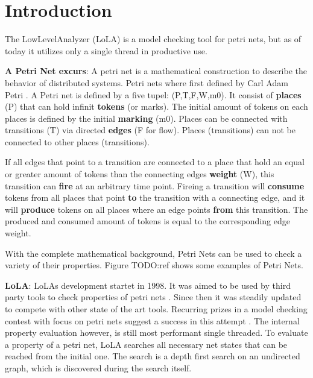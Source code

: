 \chapter{Introduction}

The LowLevelAnalyzer (LoLA) is a model checking tool for petri nets, but as of today it utilizes only a single thread in productive use.

\textbf{A Petri Net excurs}:
A petri net is a mathematical construction to describe the behavior of distributed systems. Petri nets where first defined by Carl Adam Petri \cite{petri1962kommunikation}. A Petri net is defined by a five tupel: (P,T,F,W,m0). It consist of \textbf{places} (P) that can hold infinit \textbf{tokens} (or marks). The initial amount of tokens on each places is defined by the initial \textbf{marking} (m0). Places can be connected with transitions (T) via directed \textbf{edges} (F for flow). Places (transitions) can not be connected to other places (transitions). 

If all edges that point to a transition are connected to a place that hold an equal or greater amount of tokens than the connecting edges \textbf{weight} (W), this transition can \textbf{fire} at an arbitrary time point. Fireing a transition will \textbf{consume} tokens from all places that point \textbf{to} the transition with a connecting edge, and it will \textbf{produce} tokens on all places where an edge points \textbf{from} this transition. The produced and consumed amount of tokens is equal to the corresponding edge weight.

With the complete mathematical background, Petri Nets can be used to check a variety of their properties. Figure TODO:ref shows some examples of Petri Nets.



\textbf{LoLA}:
LoLAs development startet in 1998. It was aimed to be used by third party tools to check properties of petri nets \cite{schmidt2000lola}. Since then it was steadily updated to compete with other state of the art tools. Recurring prizes in a model checking contest with focus on petri nets suggest a success in this attempt \cite{MCC2017}.
The internal property evaluation however, is still most performant single threaded. To evaluate a property of a petri net, LoLA searches all necessary net states that can be reached from the initial one. The search is a depth first search on an undirected graph, which is discovered during the search itself.

